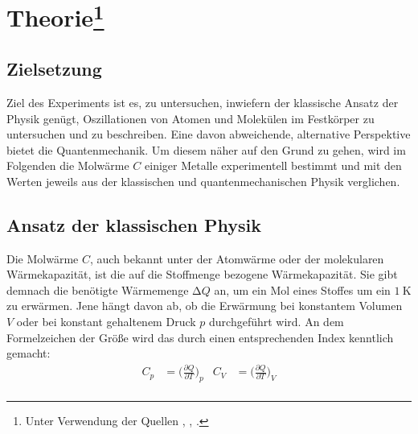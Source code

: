 \section{Theorie\footnote{Unter Verwendung der Quellen \cite{demtroeder}, \cite{Versuchsanleitung}, \cite{gerthsen}.}}
\label{sec:Theorie}
\subsection{Zielsetzung}
    Ziel des Experiments ist es, zu untersuchen, inwiefern der klassische Ansatz der Physik genügt, Oszillationen von 
    Atomen und Molekülen im Festkörper zu untersuchen und zu beschreiben. 
    Eine davon abweichende, alternative Perspektive bietet die Quantenmechanik. 
    Um diesem näher auf den Grund zu gehen, wird im Folgenden die Molwärme $C$ einiger Metalle experimentell bestimmt und 
    mit den Werten jeweils aus der klassischen und quantenmechanischen Physik verglichen. 
\subsection{Ansatz der klassischen Physik}
    Die Molwärme $C$, auch bekannt unter der Atomwärme oder der molekularen Wärmekapazität, ist die auf die 
    Stoffmenge bezogene Wärmekapazität. 
    Sie gibt demnach die benötigte Wärmemenge $\increment Q$ an, um ein Mol eines Stoffes um ein $\SI{1}{\kelvin}$ zu erwärmen.
    Jene hängt davon ab, ob die Erwärmung bei konstantem Volumen $V$ oder bei konstant gehaltenem Druck $p$ durchgeführt 
    wird. An dem Formelzeichen der Größe wird das durch einen entsprechenden Index kenntlich gemacht: 
    \begin{align*}
        C_{p} &= \biggl(\frac{\partial Q}{\partial T}\biggr)_{p} &
        C_{V} &= \biggl(\frac{\partial Q}{\partial T}\biggr)_{V} \\
    \end{align*}

